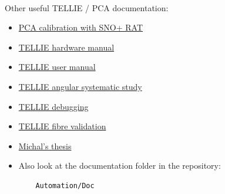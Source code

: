 \documentclass[12pt]{article}
\begin{document}
\paragraph{}
Other useful TELLIE / PCA documentation:
\begin{itemize}
	\item \href{https://www.snolab.ca/snoplus/private/DocDB/cgi/ShowDocument?docid=1987}{PCA calibration with SNO+ RAT}
	\item \href{https://www.snolab.ca/snoplus/private/DocDB/cgi/ShowDocument?docid=4486&version=1}{TELLIE hardware manual}
	\item \href{http://users.sussex.ac.uk/~mr514/TELLIE_Usersmanual.pdf}{TELLIE user manual}
	\item \href{http://users.sussex.ac.uk/~mr514/TELLIE_angular_systematic.pdf}{TELLIE angular systematic study}
	\item \href{http://users.sussex.ac.uk/~mr514/TELLIE_debugging_manual.pdf}{TELLIE debugging}
	\item \href{http://users.sussex.ac.uk/~mr514/TELLIE_fibre_validation.pdf}{TELLIE fibre validation}
	\item \href{https://www.snolab.ca/snoplus/private/DocDB/cgi/ShowDocument?docid=7192}{Michal's thesis}
	\item Also look at the documentation folder in the repository:
	\begin{lstlisting}
	Automation/Doc
	\end{lstlisting}
\end{itemize}
\end{document}
